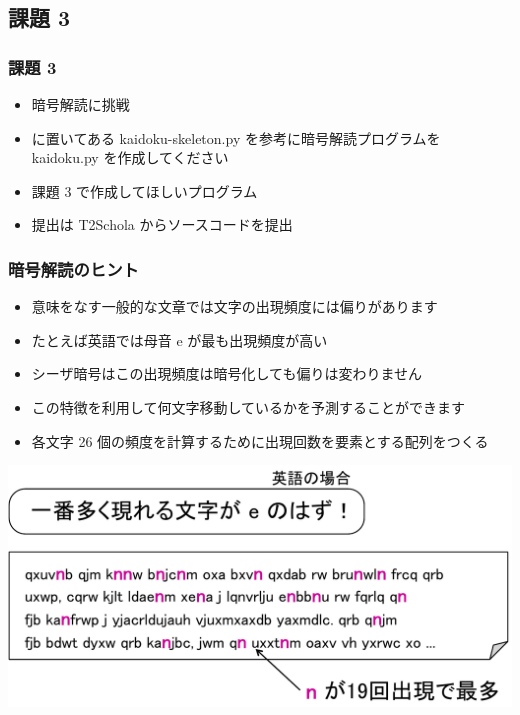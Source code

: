 \subsection{課題 3}
\begin{frame}
\frametitle{課題 3}
  \begin{itemize}
\item 暗号解読に挑戦
\item \href{https://sites.google.com/presystems.xyz/elementarycs/top}{}に置いてある kaidoku-skeleton.py を参考に暗号解読プログラムを kaidoku.py を作成してください
\item 課題 3 で作成してほしいプログラム
\item 提出は T2Schola からソースコードを提出
  \end{itemize}
\end{frame}
\begin{frame}
\frametitle{暗号解読のヒント}
  \begin{itemize}
\item 意味をなす一般的な文章では文字の出現頻度には偏りがあります
\item たとえば英語では母音 e が最も出現頻度が高い
\item シーザ暗号はこの出現頻度は暗号化しても偏りは変わりません
\item この特徴を利用して何文字移動しているかを予測することができます
\item 各文字 26 個の頻度を計算するために出現回数を要素とする配列をつくる
  \end{itemize}
  \begin{center}
\includegraphics[scale=0.3]{./Figure/elementaryCS-figHintForCryptoanalysis.pdf}
  \end{center}
\end{frame}
